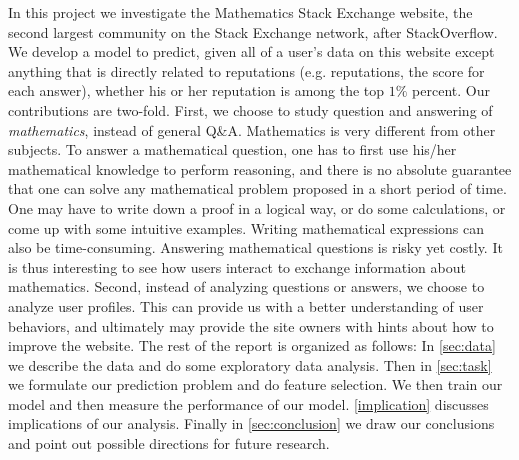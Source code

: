 \documentclass[12pt]{article}
\begin{document}
In this project we investigate the Mathematics Stack Exchange website, the second largest community on the Stack Exchange network, after StackOverflow. We develop a model to predict, given all of a user's data on this website except anything that is directly related to reputations (e.g. reputations, the score for each answer), whether his or her reputation is among the top $1\%$ percent. Our contributions are two-fold. First, we choose to study question and answering of \emph{mathematics}, instead of general Q\&A. Mathematics is very different from other subjects. To answer a mathematical question, one has to first use his/her mathematical knowledge to perform reasoning, and there is no absolute guarantee that one can solve any mathematical problem proposed in a short period of time. One may have to write down a proof in a logical way, or do some calculations, or come up with some intuitive examples. Writing mathematical expressions can also be time-consuming. Answering mathematical questions is risky yet costly. It is thus interesting to see how users interact to exchange information about mathematics. Second, instead of analyzing questions or answers, we choose to analyze user profiles. This can provide us with a better understanding of user behaviors, and ultimately may provide the site owners with hints about how to improve the website. The rest of the report is organized as follows: In \cref{sec:data} we describe the data and do some exploratory data analysis. Then in \cref{sec:task} we formulate our prediction problem and do feature selection. We then train our model and then measure the performance of our model. \cref{implication} discusses implications of our analysis. Finally in \cref{sec:conclusion} we draw our conclusions and point out possible directions for future research.

\end{document}
